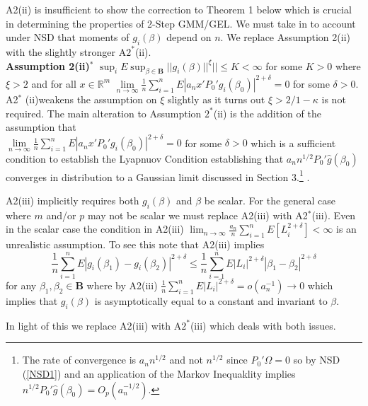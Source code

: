 \documentclass[11pt, fleqn]{article}
\begin{document}
  A2(ii) is insufficient to show the correction to Theorem 1 below which is crucial in determining the properties of 2-Step GMM/GEL. We must take in to account under NSD that moments of $g_i(\beta)$ depend on $n$. We replace Assumption 2(ii) with the slightly stronger  A$2^*$(ii).   \\

\textbf{Assumption 2(ii)$^*$} $\sup_i E\sup_{\beta \in \mathbf{B}} |\!| g_i(\beta)|\!|^\xi|\!|\leq K<\infty$ for some $K>0$ where $\xi>2$
and   for all $x \in \mathbb{R}^m$  $ \underset{n\rightarrow \infty}{\lim} \frac{1}{n}\sum_{i=1}^n E|a_nx'P_0'g_{i}(\beta_0)|^{2+\delta}=0$ for some $\delta>0$.\\

  A2$^*$ (ii)weakens the assumption on $\xi$ slightly as it turns out $\xi>2/1-\kappa$ is not required. The main alteration to Assumption $2^*$(ii) is the addition of the assumption that\\ $\underset{n\rightarrow \infty}{\lim} \frac{1}{n}\sum_{i=1}^n E|a_nx'P_0'g_{i}(\beta_0)|^{2+\delta}=0$ for some $\delta>0$ which is a sufficient condition to establish the Lyapnuov Condition  establishing that $a_nn^{1/2}P_0'\hat{g}(\beta_0)$ converges in distribution to a Gaussian limit discussed in Section 3.\footnote{ The rate of convergence is $a_nn^{1/2}$ and not $n^{1/2}$ since $P_0'\Omega=0$ so by  NSD (\ref{NSD1}) and an application of the Markov Inequaklity implies  $n^{1/2}P_0'\hat{g}(\beta_0)=O_p(a_n^{-1/2})$.}
 .

  A2(iii) implicitly requires both $g_i(\beta)$ and $\beta$ be  scalar. For the general case where $m$ and/or $p$ may not be scalar  we must replace A2(iii) with A2$^*$(iii). 
Even in the scalar case the condition in A2(iii) $\lim_{n\rightarrow \infty}\frac{a_n}{n}\sum_{i=1}^n E[L_i^{2+\delta}]<\infty$ is an unrealistic assumption. To see this note that A2(iii) implies
\begin{equation}
\frac{1}{n}\sum_{i=1}^nE|g_i(\beta_1)-g_i(\beta_2)|^{2+\delta}\leq \frac{1}{n}\sum_{i=1}^n E|L_i|^{2+\delta}|\beta_1-\beta_2|^{2+\delta}
\end{equation}
for any $\beta_1,\beta_2 \in \mathbf{B}$ where by A2(iii) $\frac{1}{n}\sum_{i=1}^n E|L_i|^{2+\delta}=o(a_n^{-1})\rightarrow 0$ which implies that $g_i(\beta)$  is asymptotically equal to a constant and invariant to $\beta$.

In light of this we replace A2(iii) with A$2^*$(iii) which deals with both issues.\\
\end{document}
